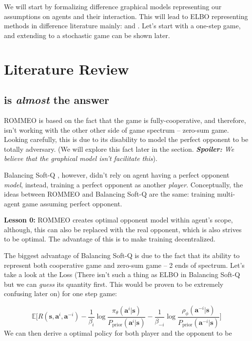 We will start by formalizing difference graphical models representing our assumptions on agents and their interaction. This will lead to ELBO representing methods in difference literature mainly:  \cite{tian2019regularized} and \cite{grau2018balancing}. Let's start with a one-step game, and extending to a stochastic game can be shown later.

\section{Literature Review}
\subsection{\cite{grau2018balancing} is \emph{almost} the answer}
ROMMEO \cite{tian2019regularized} is based on the fact that the game is fully-cooperative, and therefore, isn't working with the other other side of game spectrum -- zero-sum game. Looking carefully, this is due to its disability to model the perfect opponent to be totally adversary. (We will explore this fact later in the section. \emph{\textbf{Spoiler:} We believe that the graphical model isn't facilitate this}). 

Balancing Soft-Q \cite{grau2018balancing}, however, didn't rely on agent having a perfect opponent \emph{model}, instead, training a perfect opponent as another \emph{player}. Conceptually, the ideas between ROMMEO and Balancing Soft-Q are the same: training multi-agent game assuming perfect opponent. 
\begin{tcolorbox}
\textbf{Lesson 0: }  ROMMEO creates optimal opponent model within agent's scope, although, this can also be replaced with the real opponent, which is also strives to be optimal. The advantage of this is to make training decentralized. 
\end{tcolorbox}
The biggest advantage of Balancing Soft-Q is due to the fact that its ability to represent both cooperative game and zero-sum game -- 2 ends of spectrum. Let's take a look at the Loss (There isn't such a thing as ELBO in Balancing Soft-Q but we can \emph{guess} its quantity first. This would be proven to be extremely confusing later on) for one step game: 

\begin{equation}
    \mathbb{E}\Bigg[ R(\boldsymbol{s}, \boldsymbol{a}^i, \boldsymbol{a}^{-i}) - \frac{1}{\beta_i} \log \frac{\pi_{\theta}(\boldsymbol{a}^i | \boldsymbol{s})}{P_{\text{prior}}(\boldsymbol{a}^i | \boldsymbol{s})} - \frac{1}{\beta_{-i}} \log \frac{\rho_{\phi}(\boldsymbol{a}^{-i} | \boldsymbol{s})}{P_{\text{prior}}(\boldsymbol{a}^{-i} | \boldsymbol{s})}  \Bigg]
\end{equation}
We can then derive a optimal policy for both player and the opponent to be 

